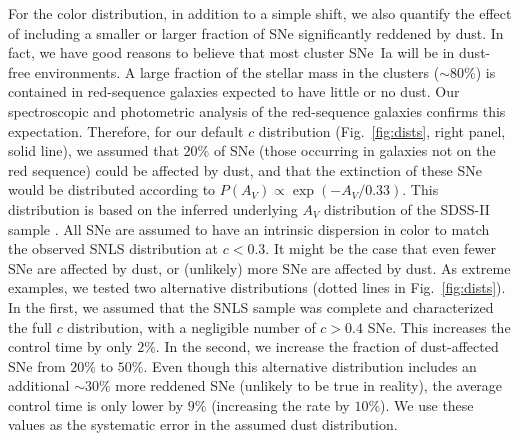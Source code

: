 For the color distribution, in addition to a simple shift, we also
quantify the effect of including a smaller or larger fraction of SNe
significantly reddened by dust. In fact, we have good reasons to
believe that most cluster SNe~Ia will be in dust-free environments. A
large fraction of the stellar mass in the clusters ($\sim 80\%$) is
contained in red-sequence galaxies expected to have little or no
dust. Our spectroscopic and photometric analysis \citep{meyers11a} of
the red-sequence galaxies confirms this expectation. Therefore, for
our default $c$ distribution (Fig.~\ref{fig:dists}, right panel, solid
line), we assumed that $20\%$ of SNe (those occurring in galaxies not
on the red sequence) could be affected by dust, and that the
extinction of these SNe would be distributed according to
$P(A_V) \propto \exp(-A_V/0.33)$. This distribution is based on the
inferred underlying $A_V$ distribution of the SDSS-II
sample \citep[][hereafter K09]{kessler09a}. All SNe are assumed to
have an intrinsic dispersion in color to match the observed SNLS
distribution at $c<0.3$. It might be the case that even fewer SNe are
affected by dust, or (unlikely) more SNe are affected by dust. As
extreme examples, we tested two alternative distributions (dotted
lines in Fig.~\ref{fig:dists}). In the first, we assumed that the SNLS
sample was complete and characterized the full $c$ distribution, with
a negligible number of $c>0.4$ SNe. This increases the control time by
only $2\%$. In the second, we increase the fraction of dust-affected
SNe from $20\%$ to $50\%$.  Even though this alternative distribution
includes an additional $\sim$$30\%$ more reddened SNe (unlikely to be
true in reality), the average control time is only lower by $9\%$
(increasing the rate by $10\%$). We use these values as the systematic
error in the assumed dust distribution.



